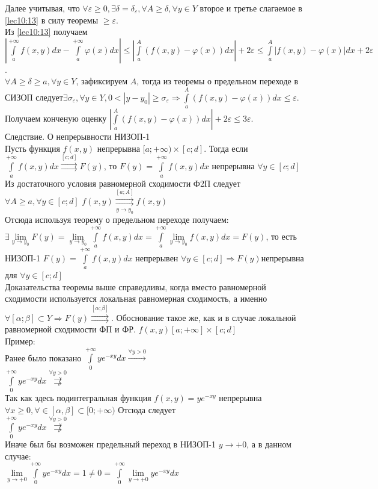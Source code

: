 \documentclass[a4paper,12pt,openany]{report}
\begin{document}
Далее учитывая, что $\forall \varepsilon \ge 0, \exists \delta = \delta_\varepsilon, \forall A \ge \delta, \forall y \in Y  $ второе и третье слагаемое в \eqref{lec10:13}
в силу теоремы $ \ge \varepsilon$.
\\
Из \eqref{lec10:13} получаем $ \left| \int\limits_{a}^{+\infty}f(x,y)dx - \int\limits_{a}^{+\infty}\varphi(x)dx\right| \le \left| \int\limits_{a}^{A}(f(x,y) - \varphi(x))dx \right| + 2\varepsilon \le \int\limits_{a}^{A}\left| f(x,y) - \varphi(x)\right|dx + 2\varepsilon  $.
\\
$ \forall A \ge \delta \ge a, \forall y \in Y$, зафиксируем $A$, тогда из теоремы о предельном переходе в СИЗОП следует$ \exists \sigma_\varepsilon, \forall y \in Y, 0 < \left|y - y_0 \right| \ge \sigma_\varepsilon \Rightarrow \int\limits_{a}^{A}(f(x,y) - \varphi(x))dx \le \varepsilon   $.
\\
Получаем конченую оценку $\left| \int\limits_{a}^{A}(f(x,y) - \varphi(x))dx \right| + 2\varepsilon \le 3\varepsilon$.
\\
Следствие. О непрерывности НИЗОП-1
\\
Пусть функция $f(x,y)$ непрерывна $[a;+\infty) \times [ c; d]$. Тогда если $\int\limits_a^{+\infty}f(x,y)dx \overset{[c;d]}\rightrightarrows F(y)$, то
$ F(y) = \int\limits_a^{+\infty}f(x,y)dx$ непрерывна $\forall y \in [c;d]$
Из достаточного условия равномерной сходимости Ф2П следует $\forall A \ge a, \forall y \in [c;d] $ $f(x,y) \overset{[a;A]}{\underset{y \to y_0}{\rightrightarrows}} f(x,y) $
\\
Отсюда используя теорему о предельном переходе получаем:$\exists \underset{y \to y_0}{\lim} F(y) = \underset{y \to y_0}\lim \int\limits_a^{+\infty}f(x,y)dx = \int\limits_a^{+\infty}\underset{y \to y_0}\lim f(x,y)dx = F(y) $, то есть НИЗОП-1 $F(y) = \int\limits_a^{+\infty}f(x,y)dx $ непрерывен $ \forall y \in [c;d] \Rightarrow F(y) $непрерывна для $ \forall y \in [c;d]$
\\
Доказательства теоремы выше справедливы, когда вместо равномерной сходимости используется локальная равномерная сходимость, а именно$\forall [\alpha;\beta] \subset Y \Rightarrow F(y) \overset{[\alpha;\beta]}{\rightrightarrows}$. Обоснование такое же, как и в случае локальной равномерной сходимости ФП и ФР.
$f(x,y)$$[a;+\infty]\times[c;d]$
\\
Пример:
\\
Ранее было показано
$\int\limits_0^{+\infty}ye^{-xy}dx \xrightarrow{\forall y > 0}$
\\
$\int\limits_0^{+\infty}ye^{-xy}dx \overset{\forall y > 0}{\not\rightrightarrows}$
\\
Так как здесь подинтегральная функция $f(x,y) = ye^{-xy}$ непрерывна $\forall x \ge 0, \forall \in [\alpha,\beta] \subset [0;+\infty)$ 
Отсюда следует
\\
$\int\limits_0^{+\infty}ye^{-xy}dx \overset{\forall y > 0}{\not\rightrightarrows}$
\\
Иначе был бы возможен предельный переход в НИЗОП-1 $y \to +0 $, а в данном случае:
\\
$\underset{y \to +0}\lim\int\limits_0^{+\infty}ye^{-xy}dx = 1 \ne 0 = \int\limits_0^{+\infty}\underset{y \to +0}\lim ye^{-xy}dx$
\\
\\
\end{document}
